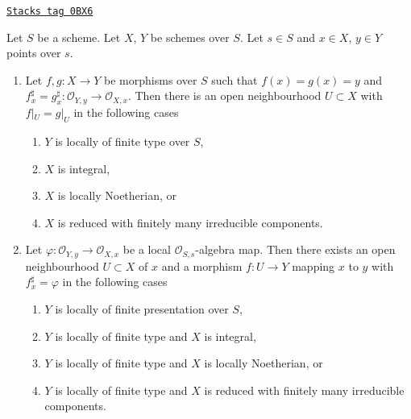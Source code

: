 \begin{lemma}
\label{morphisms-lemma-morphism-defined-local-ring}
\href{https://stacks.math.columbia.edu/tag/0BX6}{\texttt{Stacks tag 0BX6}}

Let $S$ be a scheme. Let $X$, $Y$ be schemes over $S$.
Let $s \in S$ and $x \in X$, $y \in Y$ points over $s$.
\begin{enumerate}
\item Let $f, g : X \to Y$ be morphisms over $S$ such that
$f(x) = g(x) = y$ and
$f^\sharp_x = g^\sharp_x : \mathcal{O}_{Y, y} \to \mathcal{O}_{X, x}$.
Then there is an open neighbourhood $U \subset X$ with
$f|_U = g|_U$ in the following cases
\begin{enumerate}
\item $Y$ is locally of finite type over $S$,
\item $X$ is integral,
\item $X$ is locally Noetherian, or
\item $X$ is reduced with finitely many irreducible components.
\end{enumerate}
\item Let $\varphi : \mathcal{O}_{Y, y} \to \mathcal{O}_{X, x}$
be a local $\mathcal{O}_{S, s}$-algebra map. Then there exists
an open neighbourhood $U \subset X$ of $x$ and a morphism $f : U \to Y$
mapping $x$ to $y$ with $f^\sharp_x = \varphi$ in the following cases
\begin{enumerate}
\item $Y$ is locally of finite presentation over $S$,
\item $Y$ is locally of finite type and $X$ is integral,
\item $Y$ is locally of finite type and $X$ is locally Noetherian, or
\item $Y$ is locally of finite type and $X$ is reduced with finitely
many irreducible components.
\end{enumerate}
\end{enumerate}
\end{lemma}

